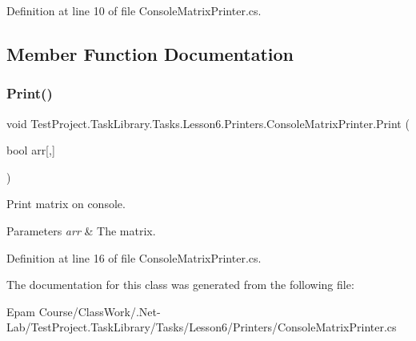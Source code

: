 Definition at line 10 of file Console\+Matrix\+Printer.\+cs.



\subsection{Member Function Documentation}
\mbox{\label{class_test_project_1_1_task_library_1_1_tasks_1_1_lesson6_1_1_printers_1_1_console_matrix_printer_a1f65f008aaa8788eb677dd47829743fb}} 
\subsubsection{\texorpdfstring{Print()}{Print()}}
{\footnotesize\ttfamily void Test\+Project.\+Task\+Library.\+Tasks.\+Lesson6.\+Printers.\+Console\+Matrix\+Printer.\+Print (\begin{DoxyParamCaption}\item[{bool}]{arr\mbox{[},\mbox{]} }\end{DoxyParamCaption})}



Print matrix on console. 


\begin{DoxyParams}{Parameters}
{\em arr} & The matrix.\\
\hline
\end{DoxyParams}


Definition at line 16 of file Console\+Matrix\+Printer.\+cs.



The documentation for this class was generated from the following file\+:\begin{DoxyCompactItemize}
\item 
Epam Course/\+Class\+Work/.\+Net-\/\+Lab/\+Test\+Project.\+Task\+Library/\+Tasks/\+Lesson6/\+Printers/Console\+Matrix\+Printer.\+cs\end{DoxyCompactItemize}
